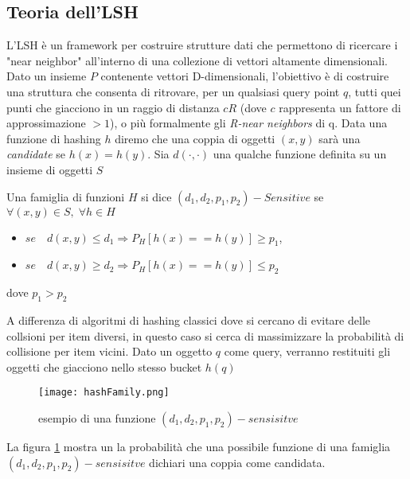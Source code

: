 \subsection{Teoria dell'LSH}
 L'LSH è un framework per costruire strutture dati che permettono di ricercare i "near neighbor" all'interno di una collezione di vettori altamente dimensionali.  
Dato un insieme $P$ contenente vettori D-dimensionali, l'obiettivo è di costruire una struttura che consenta di ritrovare, per un qualsiasi query point $q$, tutti quei punti che giacciono in un raggio di distanza $cR$ (dove $c$ rappresenta un fattore di approssimazione $>1$), o più formalmente gli \emph{R-near neighbors} di q.
 Data una funzione di hashing $h$ diremo che una coppia di oggetti $(x,y)$ sarà una \emph{candidate}   se $h(x)=h(y)$. \color{red} Sia $d(\cdot,\cdot)$ una qualche funzione  definita su un insieme di oggetti $S$ \color{black}
\begin{definizione} 

Una famiglia di funzioni $H$ si dice $(d_1,d_2,p_1,p_2)-Sensitive$ se  $\forall (x,y) \in S ,\;\forall h \in H $ 


\begin{itemize}
\item $se \quad  d(x,y)\leq d_1 \Rightarrow P_H[h(x)==h(y)]\geq p_1  $,
\item $se \quad  d(x,y)\geq d_2 \Rightarrow P_H[h(x)==h(y)]\leq p_2  $
\end{itemize}
dove $p_1>p_2$
\end{definizione}
A differenza di algoritmi di hashing classici dove si cercano di evitare delle collsioni per item diversi, in questo caso si cerca di massimizzare la probabilità di collisione per item vicini. 
Dato un oggetto $q$ come query, verranno restituiti gli oggetti che giacciono nello stesso bucket $h(q)$
 \color{black}

\begin{figure}[h]
\centering
\texttt{[image: hashFamily.png]}
\caption{esempio di una funzione $(d_1,d_2,p_1,p_2)-sensisitve$}
\label{fig:lshfamily}
\end{figure} 
 
La figura \ref{fig:lshfamily} mostra un la probabilità che una possibile funzione di una famiglia  $(d_1,d_2,p_1,p_2)-sensisitve$ dichiari una coppia come candidata.

